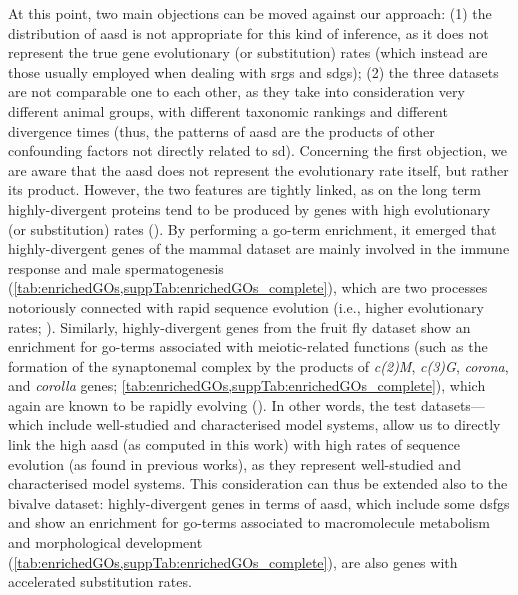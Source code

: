 At this point, two main objections can be moved against our approach: (1) the distribution of \gls{aasd} is not appropriate for this kind of inference, as it does not represent the true gene evolutionary (or substitution) rates (which instead are those usually employed when dealing with \glspl{srg} and \glspl{sdg}); (2) the three datasets are not comparable one to each other, as they take into consideration very different animal groups, with different taxonomic rankings and different divergence times (thus, the patterns of \gls{aasd} are the products of other confounding factors not directly related to \gls{sd}). Concerning the first objection, we are aware that the \gls{aasd} does not represent the evolutionary rate itself, but rather its product. However, the two features are tightly linked, as on the long term highly-divergent proteins tend to be produced by genes with high evolutionary (or substitution) rates (). By performing a \gls{go}-term enrichment, it emerged that highly-divergent genes of the mammal dataset are mainly involved in the immune response and male spermatogenesis (\cref{tab:enrichedGOs,suppTab:enrichedGOs_complete}), which are two processes notoriously connected with rapid sequence evolution (i.e., higher evolutionary rates; ). Similarly, highly-divergent genes from the fruit fly dataset show an enrichment for \gls{go}-terms associated with meiotic-related functions (such as the formation of the synaptonemal complex by the products of \textit{c(2)M}, \textit{c(3)G}, \textit{corona}, and \textit{corolla} genes; \cref{tab:enrichedGOs,suppTab:enrichedGOs_complete}), which again are known to be rapidly evolving (). In other words, the test datasets---which include well-studied and characterised model systems, allow us to directly link the high \gls{aasd} (as computed in this work) with high rates of sequence evolution (as found in previous works), as they represent well-studied and characterised model systems. This consideration can thus be extended also to the bivalve dataset: highly-divergent genes in terms of \gls{aasd}, which include some \glspl{dsfg} and show an enrichment for \gls{go}-terms associated to macromolecule metabolism and morphological development (\cref{tab:enrichedGOs,suppTab:enrichedGOs_complete}), are also genes with accelerated substitution rates.


